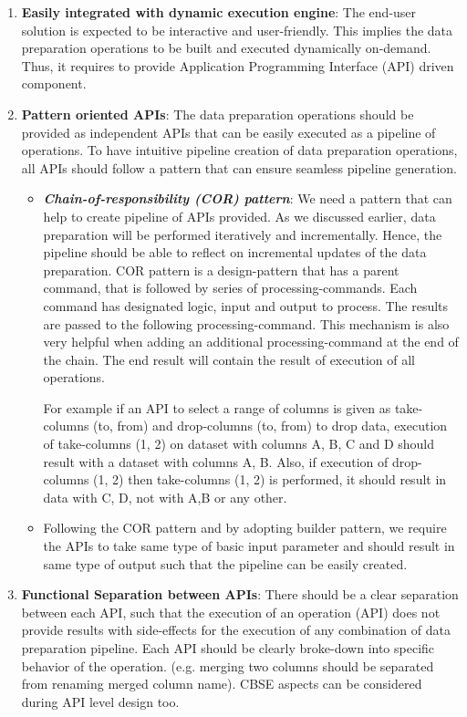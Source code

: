 \begin{enumerate}
\item \textbf{Easily integrated with dynamic execution engine}: The end-user solution is expected to be interactive and user-friendly. This implies the data preparation operations to be built and executed dynamically on-demand. Thus, it requires to provide Application Programming Interface (API) driven component.
\item \textbf{Pattern oriented APIs}: The data preparation operations should be provided as independent APIs that can be easily executed as a pipeline of operations. To have intuitive pipeline creation of data preparation operations, all APIs should follow a pattern that can ensure seamless pipeline generation.
\begin{itemize}
\item \textit{\textbf{Chain-of-responsibility (COR) pattern}}: We need a pattern that can help to create pipeline of APIs provided. As we discussed earlier, data preparation will be performed iteratively and incrementally. Hence, the pipeline should be able to reflect on incremental updates of the data preparation. COR pattern is a design-pattern that has a parent command, that is followed by series of processing-commands. Each command has designated logic, input and output to process. The results are passed to the following processing-command. This mechanism is also very helpful when adding an additional processing-command at the end of the chain. The end result will contain the result of execution of all operations. 

For example if an API to select a range of columns is given as take-columns (to, from) and drop-columns (to, from) to drop data, execution of take-columns (1, 2) on dataset with columns A, B, C and D should result with a dataset with columns A, B. Also, if execution of drop-columns (1, 2) then take-columns (1, 2) is performed, it should result in data with C, D, not with A,B or any other. 
\item Following the COR pattern and by adopting builder pattern, we require the APIs to take same type of basic input parameter and should result in same type of output such that the pipeline can be easily created. 
\end{itemize}
\item \textbf{Functional Separation between APIs}: There should be a clear separation between each API, such that the execution of an operation (API) does not provide results with side-effects for the execution of any combination of data preparation pipeline. Each API should be clearly broke-down into specific behavior of the operation. (e.g. merging two columns should be separated from renaming merged column name). CBSE aspects can be considered during API level design too.
\end{enumerate}
